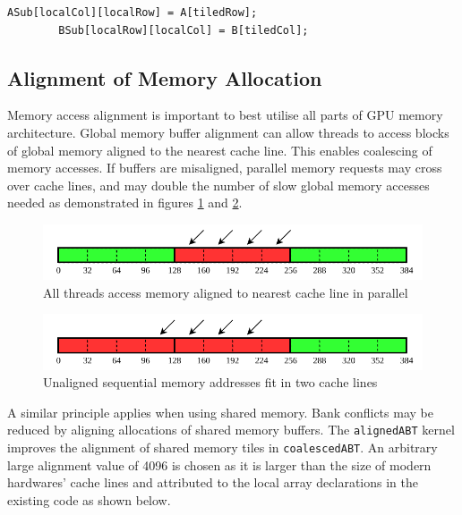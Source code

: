 \documentclass[review=false, sigchi]{acmart}
\begin{document}
	\begin{lstlisting}[firstnumber=20]
		ASub[localCol][localRow] = A[tiledRow];
		BSub[localRow][localCol] = B[tiledCol];
	\end{lstlisting}
	
	
	\subsection{Alignment of Memory Allocation}
	
	Memory access alignment is important to best utilise all parts of GPU memory architecture. Global memory buffer alignment can allow threads to access blocks of global memory aligned to the nearest cache line. This enables coalescing of memory accesses. If buffers are misaligned, parallel memory requests may cross over cache lines, and may double the number of slow global memory accesses needed as demonstrated in figures \ref{fig: Simple memory alignment} and \ref{fig: Simple memory misalignment}.
	
	\begin{figure}[h]
		\includegraphics[width=\linewidth]{aligned_access_coalescing.pdf}
		\caption{All threads access memory aligned to nearest cache line in parallel \cite{cudaoptimisation}}
		\label{fig: Simple memory alignment}
	\end{figure}
	
	\begin{figure}[h]
		\includegraphics[width=\linewidth]{misaligned_access_coalescing.pdf}
		\caption{Unaligned sequential memory addresses fit in two cache lines \cite{cudaoptimisation}}
		\label{fig: Simple memory misalignment}
	\end{figure}
	
	A similar principle applies when using shared memory. Bank conflicts may be reduced by aligning allocations of shared memory buffers. The \texttt{alignedABT} kernel improves the alignment of shared memory tiles in \texttt{coalescedABT}. An arbitrary large alignment value of 4096 is chosen as it is larger than the size of modern hardwares' cache lines and attributed to the local array declarations in the existing code as shown below.
	
\end{document}
